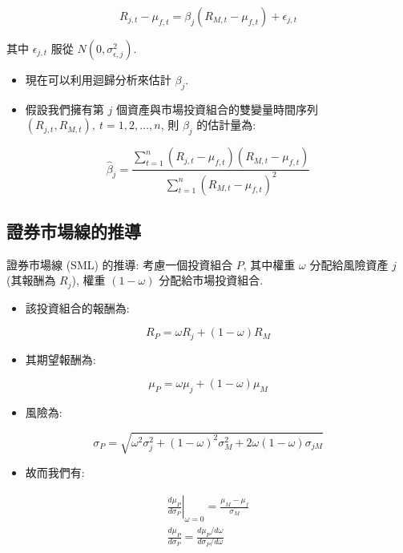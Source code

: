 \documentclass[letterpaper]{article}
\begin{document}
		
		$$
		R_{j, t}-\mu_{f, t}=\beta_{j}\left (R_{M, t}-\mu_{f, t}\right) +\epsilon_{j, t}
		$$
		
		其中 $\epsilon_{j, t}$ 服從 $N\left (0, \sigma_{\epsilon, j}^{2}\right) $. 
		
		\begin{itemize}
			\item 現在可以利用迴歸分析來估計 $\beta_{j}$. 
			\item 假設我們擁有第 $j$ 個資產與市場投資組合的雙變量時間序列 $\left (R_{j, t}, R_{M, t}\right), \ t=1, 2, \ldots, n$, 則 $\beta_{j}$ 的估計量為: 
		\end{itemize}
		
		
		$$
		\hat{\beta}_{j}=\frac{\sum_{t=1}^{n}\left (R_{j, t}-\mu_{f, t}\right) \left (R_{M, t}-\mu_{f, t}\right) }{\sum_{t=1}^{n}\left (R_{M, t}-\mu_{f, t}\right) ^{2}}
		$$
		
		\subsection{證券市場線的推導}
		證券市場線 (SML) 的推導: 考慮一個投資組合 $P$, 其中權重 $\omega$ 分配給風險資產 $j$ (其報酬為 $R_{j}$), 權重 $ (1-\omega) $ 分配給市場投資組合. 
		
		\begin{itemize}
			\item 該投資組合的報酬為: 
		\end{itemize}
		
		
		$$
		R_{P}=\omega R_{j}+ (1-\omega) R_{M}
		$$
		
		\begin{itemize}
			\item 其期望報酬為: 
		\end{itemize}
		
		$$
		\mu_{P}=\omega \mu_{j}+ (1-\omega) \mu_{M}
		$$
		
		\begin{itemize}
			\item 風險為: 
		\end{itemize}
		
		$$
		\sigma_{P}=\sqrt{\omega^{2} \sigma_{j}^{2}+ (1-\omega) ^{2} \sigma_{M}^{2}+2 \omega (1-\omega) \sigma_{j M}}
		$$
		
		\begin{itemize}
			\item 故而我們有: 
		\end{itemize}
		
		$$
		\begin{gathered}
			\left.\frac{d \mu_{P}}{d \sigma_{P}}\right|_{\omega=0}=\frac{\mu_{M}-\mu_{f}}{\sigma_{M}} \\
			\frac{d \mu_{P}}{d \sigma_{P}}=\frac{d \mu_{P} / d \omega}{d \sigma_{P} / d \omega}
		\end{gathered}
		$$
		
\end{document}
